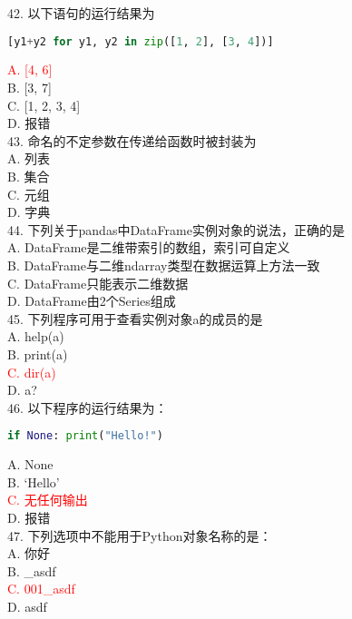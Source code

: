 \documentclass[6pt]{article}
\begin{document}
42. 以下语句的运行结果为

\begin{lstlisting}[language=Python]
[y1+y2 for y1, y2 in zip([1, 2], [3, 4])]
\end{lstlisting}
\textcolor{red}{A. [4, 6]}\\
B. [3, 7]\\
C. [1, 2, 3, 4]\\
D. 报错\\

43. 命名的不定参数在传递给函数时被封装为\\

A. 列表\\
B. 集合\\
C. 元组\\
D. 字典\\

44. 下列关于pandas中DataFrame实例对象的说法，正确的是\\

A. DataFrame是二维带索引的数组，索引可自定义\\
B. DataFrame与二维ndarray类型在数据运算上方法一致\\
C. DataFrame只能表示二维数据\\
D. DataFrame由2个Series组成\\

45. 下列程序可用于查看实例对象a的成员的是\\

A. help(a)\\
B. print(a)\\
\textcolor{red}{C. dir(a)}\\
D. a?\\

46. 以下程序的运行结果为：\\

\begin{lstlisting}[language=Python]
if None: print("Hello!")
\end{lstlisting}
A. None\\
B. ‘Hello’\\
\textcolor{red}{C. 无任何输出}\\
D. 报错\\

47. 下列选项中不能用于Python对象名称的是：\\

A. 你好\\
B. \_asdf\\
\textcolor{red}{C. 001\_asdf}\\
D. asdf\\
\end{document}
